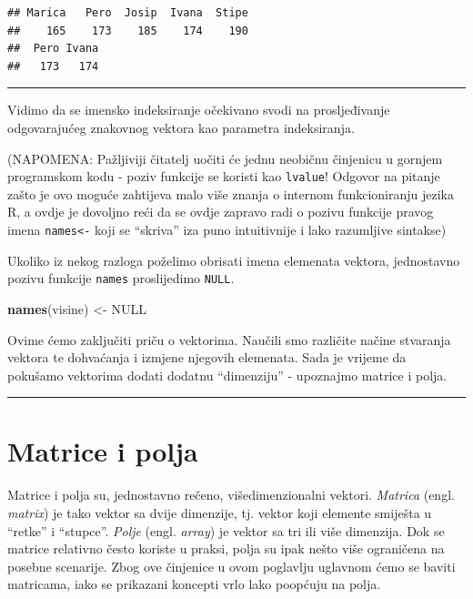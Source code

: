 \documentclass[]{book}
\newenvironment{Shaded}{\begin{snugshade}}{\end{snugshade}}
\newcommand{\KeywordTok}[1]{\textcolor[rgb]{0.13,0.29,0.53}{\textbf{#1}}}
\newcommand{\StringTok}[1]{\textcolor[rgb]{0.31,0.60,0.02}{#1}}
\newcommand{\OtherTok}[1]{\textcolor[rgb]{0.56,0.35,0.01}{#1}}
\newcommand{\NormalTok}[1]{#1}
\theoremstyle{definition}
\theoremstyle{definition}
\theoremstyle{definition}
\theoremstyle{remark}
\begin{document}
\begin{verbatim}
## Marica   Pero  Josip  Ivana  Stipe 
##    165    173    185    174    190 
##  Pero Ivana 
##   173   174
\end{verbatim}

\begin{center}\rule{0.5\linewidth}{\linethickness}\end{center}

Vidimo da se imensko indeksiranje očekivano svodi na prosljeđivanje
odgovarajućeg znakovnog vektora kao parametra indeksiranja.

(NAPOMENA: Pažljiviji čitatelj uočiti će jednu neobičnu činjenicu u
gornjem programskom kodu - poziv funkcije se koristi kao
\texttt{lvalue}! Odgovor na pitanje zašto je ovo moguće zahtijeva malo
više znanja o internom funkcioniranju jezika R, a ovdje je dovoljno reći
da se ovdje zapravo radi o pozivu funkcije pravog imena
\texttt{names\textless{}-} koji se ``skriva'' iza puno intuitivnije i
lako razumljive sintakse)

Ukoliko iz nekog razloga poželimo obrisati imena elemenata vektora,
jednostavno pozivu funkcije \texttt{names} proslijedimo \texttt{NULL}.

\begin{Shaded}
\begin{Highlighting}[]
\KeywordTok{names}\NormalTok{(visine) <-}\StringTok{ }\OtherTok{NULL}
\end{Highlighting}
\end{Shaded}

Ovime ćemo zaključiti priču o vektorima. Naučili smo različite načine
stvaranja vektora te dohvaćanja i izmjene njegovih elemenata. Sada je
vrijeme da pokušamo vektorima dodati dodatnu ``dimenziju'' - upoznajmo
matrice i polja.

\begin{center}\rule{0.5\linewidth}{\linethickness}\end{center}

\section{Matrice i polja}\label{matrice-i-polja}

Matrice i polja su, jednostavno rečeno, višedimenzionalni vektori.
\emph{Matrica} (engl. \emph{matrix}) je tako vektor sa dvije dimenzije,
tj. vektor koji elemente smiješta u ``retke'' i ``stupce''. \emph{Polje}
(engl. \emph{array}) je vektor sa tri ili više dimenzija. Dok se matrice
relativno često koriste u praksi, polja su ipak nešto više ograničena na
posebne scenarije. Zbog ove činjenice u ovom poglavlju uglavnom ćemo se
baviti matricama, iako se prikazani koncepti vrlo lako poopćuju na
polja.
\end{document}
